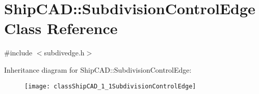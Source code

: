 \hypertarget{classShipCAD_1_1SubdivisionControlEdge}{}\section{Ship\+C\+AD\+:\+:Subdivision\+Control\+Edge Class Reference}
\label{classShipCAD_1_1SubdivisionControlEdge}


{\ttfamily \#include $<$subdivedge.\+h$>$}

Inheritance diagram for Ship\+C\+AD\+:\+:Subdivision\+Control\+Edge\+:\begin{figure}[H]
\begin{center}
\leavevmode
\texttt{[image: classShipCAD\_1\_1SubdivisionControlEdge]}
\end{center}
\end{figure}
